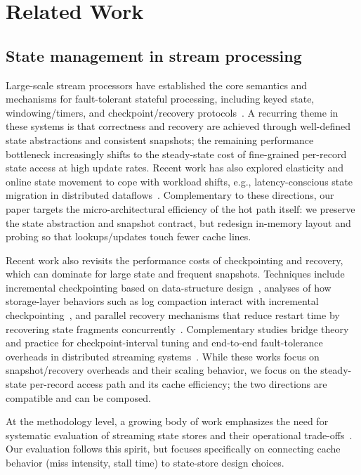 \documentclass[sigconf]{acmart}
\begin{document}
\section{Related Work}
\subsection{State management in stream processing}
Large-scale stream processors have established the core semantics and mechanisms for fault-tolerant stateful processing, including keyed state, windowing/timers, and checkpoint/recovery protocols~\cite{akidau2013millwheel,akidau2015dataflow,carbone2017flinkstate,armbrust2018structured,murray2013naiad,chandramouli2014trill,meehan2015sstore}. A recurring theme in these systems is that correctness and recovery are achieved through well-defined state abstractions and consistent snapshots; the remaining performance bottleneck increasingly shifts to the steady-state cost of fine-grained per-record state access at high update rates. Recent work has also explored elasticity and online state movement to cope with workload shifts, e.g., latency-conscious state migration in distributed dataflows~\cite{hoffmann2019megaphone}. Complementary to these directions, our paper targets the micro-architectural efficiency of the hot path itself: we preserve the state abstraction and snapshot contract, but redesign in-memory layout and probing so that lookups/updates touch fewer cache lines.

Recent work also revisits the performance costs of checkpointing and recovery, which can dominate for large state and frequent snapshots. Techniques include incremental checkpointing based on data-structure design~\cite{lin2022incrementalckpt}, analyses of how storage-layer behaviors such as log compaction interact with incremental checkpointing~\cite{chronarakis2019logcompaction}, and parallel recovery mechanisms that reduce restart time by recovering state fragments concurrently~\cite{liu2020fp4s}. Complementary studies bridge theory and practice for checkpoint-interval tuning and end-to-end fault-tolerance overheads in distributed streaming systems~\cite{jayasekara2022checkpointopt}. While these works focus on snapshot/recovery overheads and their scaling behavior, we focus on the steady-state per-record access path and its cache efficiency; the two directions are compatible and can be composed.

At the methodology level, a growing body of work emphasizes the need for systematic evaluation of streaming state stores and their operational trade-offs~\cite{asyabi2022statebench}. Our evaluation follows this spirit, but focuses specifically on connecting cache behavior (miss intensity, stall time) to state-store design choices.
\end{document}
